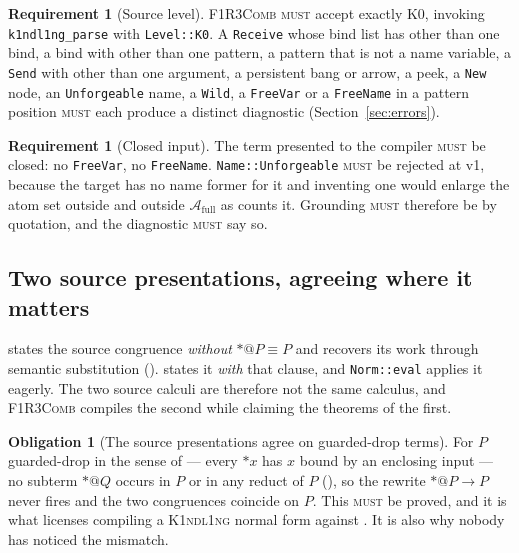 \documentclass[11pt,a4paper]{article}
\makeatletter
\newcommand{\code}[1]{\texttt{#1}}
\newcommand{\Comb}{\textsc{F1R3Comb}}
\newcommand{\Kind}{\textsc{K1ndl1ng}}
\newcommand{\MUST}{\textsc{must}}
\newcommand{\quo}[1]{@#1}
\newcommand{\drp}[1]{{*}#1}
\newcommand{\scong}{\equiv}
\newcommand{\Atm}{\mathcal{A}}
\theoremstyle{definition}
\newtheorem{requirement}[definition]{Requirement}
\newtheorem{obligation}[definition]{Obligation}
\theoremstyle{plain}
\makeatother
\begin{document}
\begin{requirement}[Source level]\label{req:level}
\Comb{} \MUST{} accept exactly K0, invoking \code{k1ndl1ng\_parse} with
\code{Level::K0}. A \code{Receive} whose bind list has other than one bind, a
bind with other than one pattern, a pattern that is not a name variable, a
\code{Send} with other than one argument, a persistent bang or arrow, a peek,
a \code{New} node, an \code{Unforgeable} name, a \code{Wild}, a
\code{FreeVar} or a \code{FreeName} in a pattern position \MUST{} each produce
a distinct diagnostic (Section~\ref{sec:errors}).
\end{requirement}

\begin{requirement}[Closed input]\label{req:closed}
The term presented to the compiler \MUST{} be closed: no \code{FreeVar}, no
\code{FreeName}. \code{Name::Unforgeable} \MUST{} be rejected at v1, because
the target has no name former for it and inventing one would enlarge the
atom set outside \cite{draft3} and outside $\Atm_{\mathrm{full}}$ as
\cite[Def.~2.1]{logic} counts it. Grounding \MUST{} therefore be by
quotation, and the diagnostic \MUST{} say so.
\end{requirement}

\subsection{Two source presentations, agreeing where it matters}

\cite[\S2]{draft3} states the source congruence \emph{without}
$\drp{\quo{P}} \scong P$ and recovers its work through semantic substitution
(\cite[Def.~2.3]{draft3}). \cite[Def.~2.6]{k1ndl1ng} states it \emph{with}
that clause, and \code{Norm::eval} applies it eagerly. The two source
calculi are therefore not the same calculus, and \Comb{} compiles the second
while claiming the theorems of the first.

\begin{obligation}[The source presentations agree on guarded-drop terms]
\label{obl:srcagree}
For $P$ guarded-drop in the sense of \cite[Def.~2.5]{draft3} --- every
$\drp{x}$ has $x$ bound by an enclosing input --- no subterm $\drp{\quo{Q}}$
occurs in $P$ or in any reduct of $P$ (\cite[Lem.~2.6]{draft3}), so the
rewrite $\drp{\quo{P}} \to P$ never fires and the two congruences coincide on
$P$. This \MUST{} be proved, and it is what licenses compiling a \Kind{}
normal form against \cite[\S2]{draft3}. It is also why nobody has noticed the
mismatch.
\end{obligation}
\end{document}
